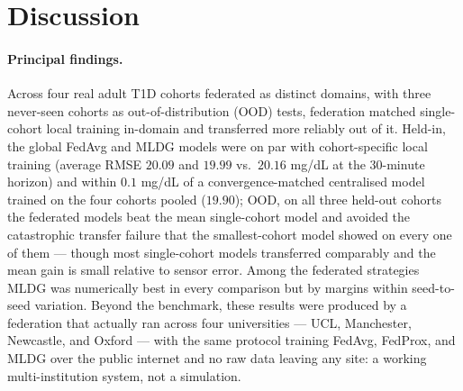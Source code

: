 \documentclass[10pt,letterpaper]{article}
\begin{document}
\section*{Discussion}

\paragraph{Principal findings.} Across four real adult T1D cohorts federated as
distinct domains, with three never-seen cohorts as out-of-distribution (OOD)
tests, federation matched single-cohort local training in-domain and transferred
more reliably out of it. Held-in, the global FedAvg and MLDG models were on par
with cohort-specific local training (average RMSE $20.09$ and $19.99$ vs.\
$20.16$ mg/dL at the 30-minute horizon) and within $0.1$ mg/dL of a
convergence-matched centralised model trained on the four cohorts pooled
($19.90$); OOD, on all three held-out cohorts the
federated models beat the mean single-cohort model and avoided the catastrophic
transfer failure that the smallest-cohort model showed on every one of them ---
though most single-cohort models transferred comparably and the mean gain is
small relative to sensor error. Among the federated strategies MLDG was
numerically best in every comparison but by margins within seed-to-seed
variation. Beyond the benchmark, these results were produced by a federation that
actually ran across four universities --- UCL, Manchester, Newcastle, and Oxford
--- with the same protocol training FedAvg, FedProx, and MLDG over the public
internet and no raw data leaving any site: a working multi-institution system,
not a simulation.
\end{document}
